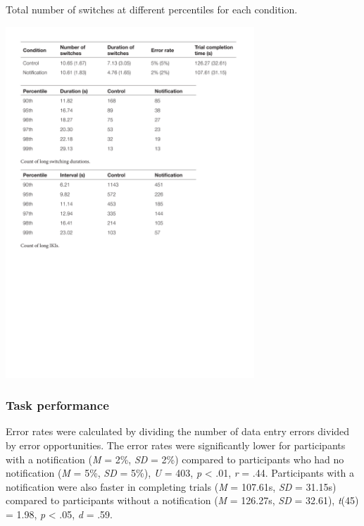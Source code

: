 \begin{table}
\caption{Total number of switches at different percentiles for each condition.}
\centering
\includegraphics[width=0.7\textwidth]{images/ch56/ch56-longswitches.pdf}
\vspace{-3pt}
\label{tbl:ch56-tblswitches}
\end{table}


\subsubsection{Task performance}
Error rates were calculated by dividing the number of data entry errors divided by error opportunities. The error rates were significantly lower for participants with a notification (\textit{M }= 2\%, \textit{SD} = 2\%) compared to participants who had no notification (\textit{M} = 5\%, \textit{SD }= 5\%), \textit{U} = 403, \textit{p} < .01, \textit{r} = .44. Participants with a notification were also faster in completing trials (\textit{M} = 107.61s, \textit{SD} = 31.15s) compared to participants without a notification (\textit{M} = 126.27s, \textit{SD} = 32.61), \textit{t}(45) = 1.98, \textit{p} < .05, \textit{d} = .59.

